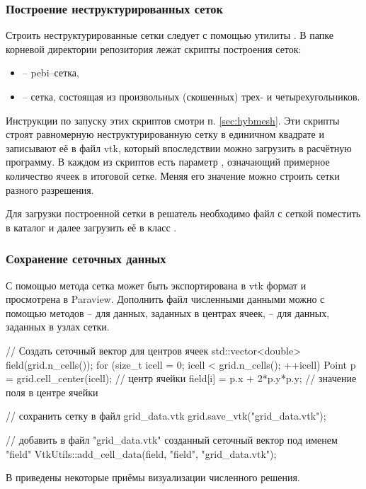 \subsubsection{Построение неструктурированных сеток}
Строить неструктурированные сетки следует с помощью утилиты .
В папке  корневой директории репозитория лежат скрипты построения сеток:
\begin{itemize}
\item {} -- pebi--сетка,
\item {} -- сетка, состоящая из произвольных (скошенных) трех- и четырехугольников.
\end{itemize}
Инструкции по запуску этих скриптов смотри п. \ref{sec:hybmesh}.
Эти скрипты строят равномерную неструктурированную сетку
в единичном квадрате
и записывают её в файл vtk, который впоследствии можно загрузить
в расчётную программу.
В каждом из скриптов есть параметр , означающий
примерное количество ячеек в итоговой сетке.
Меняя его значение можно строить сетки разного разрешения.

Для загрузки построенной сетки в решатель необходимо файл
с сеткой поместить в каталог 
и далее загрузить её в класс .


\subsubsection{Сохранение сеточных данных}
С помощью метода  сетка может быть экспортирована в vtk формат и просмотрена в Paraview.
Дополнить файл численными данными можно с помощью методов
 -- для данных, заданных в центрах ячеек,
 -- для данных, заданных в узлах сетки.

\begin{cppcode}
// Создать сеточный вектор для центров ячеек
std::vector<double> field(grid.n_cells());
for (size_t icell = 0; icell < grid.n_cells(); ++icell) {
    Point p = grid.cell_center(icell);  // центр ячейки
    field[i] = p.x + 2*p.y*p.y;    // значение поля в центре ячейки
}

// сохранить сетку в файл grid_data.vtk
grid.save_vtk("grid_data.vtk");

// добавить в файл "grid_data.vtk" созданный сеточный вектор под именем "field"
VtkUtils::add_cell_data(field, "field", "grid_data.vtk");
\end{cppcode}

В  приведены некоторые приёмы визуализации численного решения.
